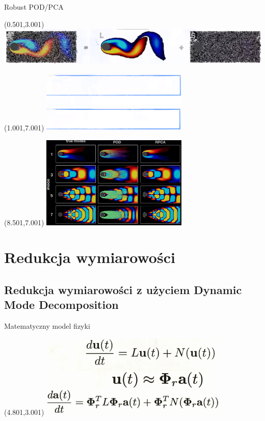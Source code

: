 \documentclass[aspectratio=169]{beamer}
\begin{document}
\begin{frame}{Robust POD/PCA}
	\begin{textblock}{13}(0.501,3.001)
		\includegraphics[width=15cm]{imgs/eigenflow.png}
	\end{textblock}
	\begin{textblock}{13}(1.001,7.001)
		\includegraphics[width=7cm]{imgs/eigenflow2.png}
	\end{textblock}
	\begin{textblock}{13}(8.501,7.001)
		\includegraphics[width=7cm]{imgs/rpca.png}
	\end{textblock}
\end{frame}







\section{Redukcja wymiarowości}
\subsection{Redukcja wymiarowości z użyciem Dynamic Mode Decomposition}
\begin{frame} {Matematyczny model fizyki}
\begin{textblock}{13}(4.801,3.001)
	\includegraphics[width=9cm]{imgs/rom1.png}
\end{textblock}
\end{frame}
\end{document}
